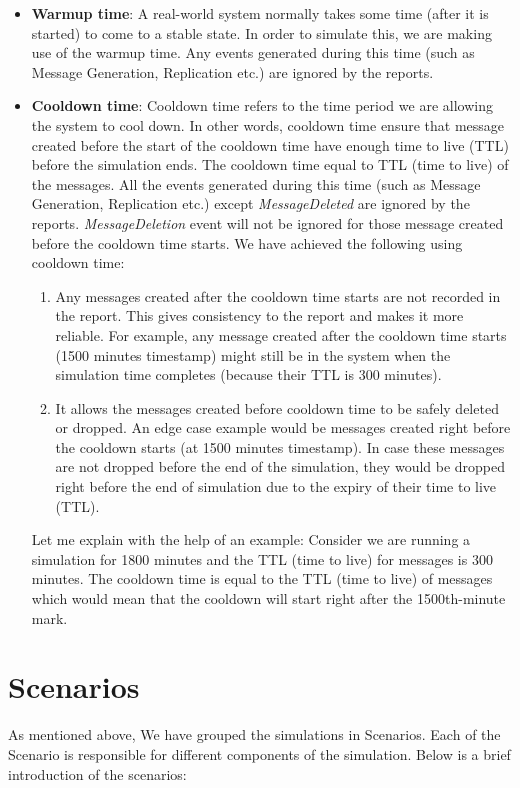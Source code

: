 \begin{itemize}
\item \textbf{Warmup time}: A real-world system normally takes some time (after it is started) to come to a stable state. In order to simulate this, we are making use of the warmup time. Any events generated during this time (such as Message Generation, Replication etc.) are ignored by the reports.
\item \textbf{Cooldown time}: Cooldown time refers to the time period we are allowing the system to cool down. In other words, cooldown time ensure that message created before the start of the cooldown time have enough time to live (TTL) before the simulation ends. The cooldown time equal to TTL (time to live) of the messages. All the events generated during this time (such as Message Generation, Replication etc.) except \textit{MessageDeleted} are ignored by the reports. \textit{MessageDeletion} event will not be ignored for those message created before the cooldown time starts. We have achieved the following using cooldown time:
\begin{enumerate}
	\item Any messages created after the cooldown time starts are not recorded in the report. This gives consistency to the report and makes it more reliable. For example, any message created after the cooldown time starts (1500 minutes timestamp) might still be in the system when the simulation time completes (because their TTL is 300 minutes).
	\item It allows the messages created before cooldown time to be safely deleted or dropped. An edge case example would be messages created right before the cooldown starts (at 1500 minutes timestamp). In case these messages are not dropped before the end of the simulation, they would be dropped right before the end of simulation due to the expiry of their time to live (TTL).
\end{enumerate}

Let me explain with the help of an example:
Consider we are running a simulation for 1800 minutes and the TTL (time to live) for messages is 300 minutes. The cooldown time is equal to the TTL (time to live) of messages which would mean that the cooldown will start right after the 1500th-minute mark.
\end{itemize}

\section{Scenarios}
As mentioned above, We have grouped the simulations in Scenarios. Each of the Scenario is responsible for different components of the simulation. Below is a brief introduction of the scenarios:

